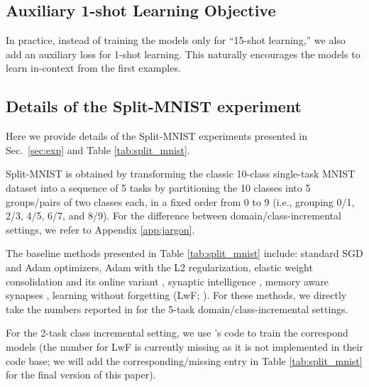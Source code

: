 \documentclass{article}
\begin{document}
\subsection{Auxiliary 1-shot Learning Objective}
\label{app:one_shot}
In practice, instead of training the models only for ``15-shot learning,'' we also add an auxiliary loss for 1-shot learning.
This naturally encourages the models to learn in-context from the first examples.

\subsection{Details of the Split-MNIST experiment}
\label{app:split_mnist}

Here we provide details of the Split-MNIST experiments presented in Sec.~\ref{sec:exp} and Table \ref{tab:split_mnist}.

Split-MNIST is obtained by transforming the classic 10-class single-task MNIST dataset into a sequence of 5  tasks by partitioning the 10 classes into 5 groups/pairs of two classes each, in a fixed order from 0 to 9 (i.e., grouping 0/1, 2/3, 4/5, 6/7, and 8/9).
For the difference between domain/class-incremental settings, we refer to Appendix \ref{app:jargon}.

The baseline methods presented in Table \ref{tab:split_mnist} include: standard SGD and Adam optimizers, Adam with the L2 regularization, elastic weight consolidation \citep{kirkpatrick2017overcoming} and its online variant \citep{Schwarz0LGTPH18}, synaptic intelligence \citep{ZenkePG17}, memory aware synapses \citep{AljundiBERT18}, learning without forgetting (LwF; \citet{LiH16}).
For these methods, we directly take the numbers reported in \citet{hsu2018re}
for the 5-task domain/class-incremental settings.

For the 2-task class incremental setting, we use  \citet{hsu2018re}'s code to train the correspond models (the number for LwF is currently missing as it is not implemented in their code base; we will add the corresponding/missing entry in Table \ref{tab:split_mnist} for the final version of this paper).
\end{document}
